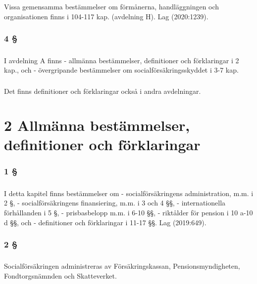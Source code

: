 \documentclass[a4paper,notitlepage,openany,10pt]{book}
\begin{document}
\paragraph*{}
Vissa gemensamma bestämmelser om förmånerna, handläggningen och organisationen finns i 104-117 kap. (avdelning H).
Lag (2020:1239).
\subsection*{4 §}
\paragraph*{}
I avdelning A finns
\newline - allmänna bestämmelser, definitioner och förklaringar i 2 kap., och
\newline - övergripande bestämmelser om socialförsäkringsskyddet i 3-7 kap.
\paragraph*{}
Det finns definitioner och förklaringar också i andra avdelningar.
\chapter*{2 Allmänna bestämmelser, definitioner och förklaringar}
\subsection*{1 §}
\paragraph*{}
I detta kapitel finns bestämmelser om
\newline - socialförsäkringens administration, m.m. i 2 §,
\newline - socialförsäkringens finansiering, m.m. i 3 och 4 §§,
\newline - internationella förhållanden i 5 §,
\newline - prisbasbelopp m.m. i 6-10 §§,
\newline - riktålder för pension i 10 a-10 d §§, och
\newline - definitioner och förklaringar i 11-17 §§.
Lag (2019:649).
\subsection*{2 §}
\paragraph*{}
Socialförsäkringen administreras av Försäkringskassan, Pensionsmyndigheten, Fondtorgsnämnden och Skatteverket.
\end{document}
